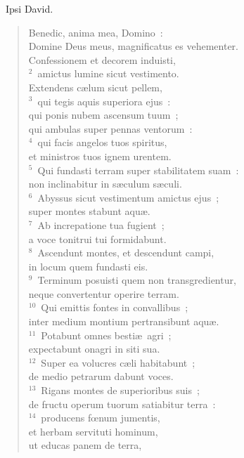 ~\lettrine[lines=10,image=true,loversize=0.05,lraise=-0.03]{I}{}psi David. \begin{flushleft}\begin{verse}\vspace{6pt}Benedic, anima mea, Domino~:\\ Domine Deus meus, magnificatus es vehementer.\\ Confessionem et decorem induisti,\\
${}^{2}$~amictus lumine sicut vestimento.\\ Extendens c\ae lum sicut pellem,\\
${}^{3}$~qui tegis aquis superiora ejus~:\\ qui ponis nubem ascensum tuum~;\\ qui ambulas super pennas ventorum~:\\
${}^{4}$~qui facis angelos tuos spiritus,\\ et ministros tuos ignem urentem.\\
${}^{5}$~Qui fundasti terram super stabilitatem suam~:\\ non inclinabitur in s\ae culum s\ae culi.\\
${}^{6}$~Abyssus sicut vestimentum amictus ejus~;\\ super montes stabunt aqu\ae .\\
${}^{7}$~Ab increpatione tua fugient~;\\ a voce tonitrui tui formidabunt.\\
${}^{8}$~Ascendunt montes, et descendunt campi,\\ in locum quem fundasti eis.\\
${}^{9}$~Terminum posuisti quem non transgredientur,\\ neque convertentur operire terram.\\
${}^{10}$~Qui emittis fontes in convallibus~;\\ inter medium montium pertransibunt aqu\ae .\\
${}^{11}$~Potabunt omnes besti\ae\ agri~;\\ expectabunt onagri in siti sua.\\
${}^{12}$~Super ea volucres c\ae li habitabunt~;\\ de medio petrarum dabunt voces.\\
${}^{13}$~Rigans montes de superioribus suis~;\\ de fructu operum tuorum satiabitur terra~:\\
${}^{14}$~producens fœnum jumentis,\\ et herbam servituti hominum,\\ ut educas panem de terra,\\

\end{verse}
\end{flushleft}
